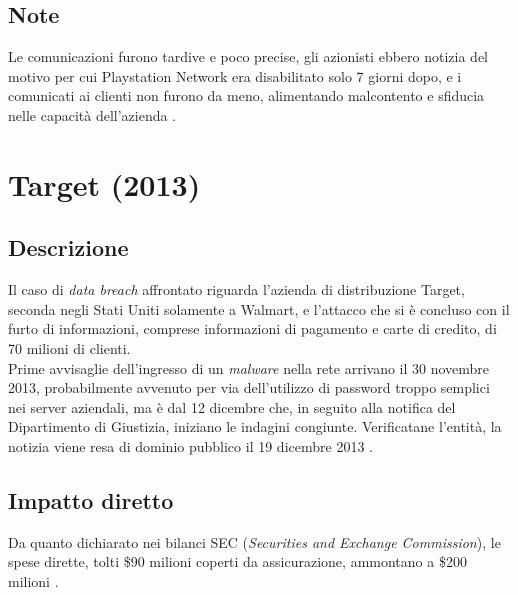\documentclass[12pt,a4paper,twoside]{report}
\begin{document}
\subsection{Note}
Le comunicazioni furono tardive e poco precise, gli azionisti ebbero notizia del motivo per cui Playstation Network era disabilitato solo 7 giorni dopo, e i comunicati ai clienti non furono da meno, alimentando malcontento e sfiducia nelle capacit\`a dell'azienda \cite{Sony_pnt}.
\section{Target (2013)}
\subsection{Descrizione}
Il caso di \textit{data breach} affrontato riguarda l'azienda di distribuzione Target, seconda negli Stati Uniti solamente a Walmart, e l'attacco che si \`e concluso con il furto di  informazioni, comprese informazioni di pagamento e carte di credito, di 70 milioni di clienti.\\
Prime avvisaglie dell'ingresso di un \textit{malware} nella rete arrivano il 30 novembre 2013, probabilmente avvenuto per via dell'utilizzo di password troppo semplici nei server aziendali, ma \`e dal 12 dicembre che, in seguito alla notifica del Dipartimento di Giustizia, iniziano le indagini congiunte. Verificatane l'entit\`a, la notizia viene resa di dominio pubblico il 19 dicembre 2013 \cite{Target}.\\
\subsection{Impatto diretto}
Da quanto dichiarato nei bilanci SEC (\textit{Securities and Exchange Commission}), le spese dirette, tolti \$90 milioni coperti da assicurazione, ammontano a \$200 milioni \cite{Target}.
\end{document}

